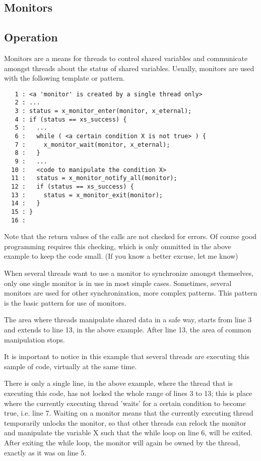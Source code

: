 %
%

\subsection{Monitors}

\subsection{Operation}

Monitors are a means for threads to control shared variables and communicate
amongst threads about the status of shared variables. Usually, monitors are
used with the following template or pattern.

\bcode
\begin{verbatim}
   1 : <a 'monitor' is created by a single thread only>
   2 : ...
   3 : status = x_monitor_enter(monitor, x_eternal);
   4 : if (status == xs_success) {
   5 :   ...
   6 :   while ( <a certain condition X is not true> ) {
   7 :     x_monitor_wait(monitor, x_eternal);
   8 :   }
   9 :   ...
  10 :   <code to manipulate the condition X>
  11 :   status = x_monitor_notify_all(monitor);
  12 :   if (status == xs_success) {
  13 :     status = x_monitor_exit(monitor);
  14 :   }
  15 : }
  16 :
\end{verbatim}
\ecode

Note that the return values of the \oswald calls are not checked for errors.
Of course good programming requires this checking, which is only ommitted in
the above example to keep the code small. (If you know a better excuse, let
me know)

When several threads want to use a monitor to synchronize amongst
themselves, only one single monitor is in use in most simple cases.
Sometimes, several monitors are used for other synchronization, more complex patterns.
This pattern is the basic pattern for use of monitors.

The area where threads manipulate shared data in a safe way, starts from
line 3 and extends to line 13, in the above example. After line 13, the area
of common manipulation stops.

It is important to notice in this example that several threads are executing
this sample of code, virtually at the same time.

There is only a single line, in the above example, where the thread that is
executing this code, has not locked the whole range of lines 3 to 13; this
is place where the currently executing thread 'waits' for a certain
condition to become true, i.e. line 7. Waiting on a monitor means that the
currently executing thread temporarily unlocks the monitor, so that other
threads can relock the monitor and manipulate the variable X such that the 
while loop on line 6, will be exited. After exiting the while loop, the
monitor will again be owned by the thread, exactly as it was on line 5.

